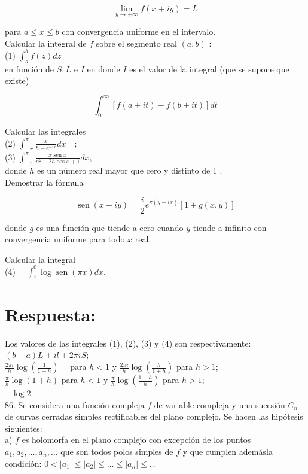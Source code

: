\documentclass[10pt]{article}
\theoremstyle{plain}
\theoremstyle{definition}
\theoremstyle{remark}
\begin{document}
$$
\lim _{y \rightarrow+\infty} f(x+i y)=L
$$

para $a \leqslant x \leqslant b$ con convergencia uniforme en el intervalo.\\
Calcular la integral de $f$ sobre el segmento real $(a, b)$ :\\
(1) $\int_{a}^{b} f(z) d z$\\
en función de $S, L$ e $I$ en donde $I$ es el valor de la integral (que se supone que existe)

$$
\int_{0}^{\infty}[f(a+i t)-f(b+i t)] d t
$$

Calcular las integrales\\
(2) $\int_{-\pi}^{\pi} \frac{x}{h-e^{-i x}} d x \quad$;\\
(3) $\int_{-\pi}^{\pi} \frac{x \operatorname{sen} x}{n^{2}-2 h \cos x+1} d x$,\\
donde $h$ es un número real mayor que cero y distinto de 1 .\\
Demostrar la fórmula

$$
\operatorname{sen}(x+i y)=\frac{i}{2} e^{\pi(y-i x)}[1+g(x, y)]
$$

donde $g$ es una función que tiende a cero cuando $y$ tiende a infinito con convergencia uniforme para todo $x$ real.

Calcular la integral\\
(4) $\quad \int_{1}^{0} \log \operatorname{sen}(\pi x) d x$.

\section*{Respuesta:}
Los valores de las integrales (1), (2), (3) y (4) son respectivamente:\\
$(b-a) L+i l+2 \pi i S ;$\\
$\frac{2 \pi i}{h} \log \left(\frac{1}{1+h}\right) \quad$ para $h<1$ y $\frac{2 \pi i}{h} \log \left(\frac{h}{1+h}\right)$ para $h>1$;\\
$\frac{\pi}{h} \log (1+h)$ para $h<1$ y $\frac{\pi}{h} \log \left(\frac{1+h}{h}\right)$ para $h>1$;\\
$-\log 2$.\\
86. Se considera una función compleja $f$ de variable compleja y una sucesión $C_{n}$ de curvas cerradas simples rectificables del plano complejo. Se hacen las hipótesis siguientes:\\
a) $f$ es holomorfa en el plano complejo con excepción de los puntos $a_{1}, a_{2}, \ldots, a_{n}, \ldots$ que son todos polos simples de $f$ y que cumplen ademásla condición: $0<\left|a_{1}\right| \leqslant\left|a_{2}\right| \leqslant \ldots \leqslant\left|a_{n}\right| \leqslant \ldots$
\end{document}
